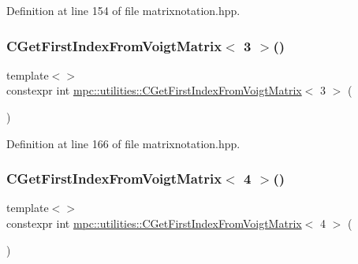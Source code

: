 Definition at line 154 of file matrixnotation.\+hpp.

\mbox{\label{namespacempc_1_1utilities_a80545c6ddda43d5f72754d0f18ec42fc}} 
\subsubsection{\texorpdfstring{C\+Get\+First\+Index\+From\+Voigt\+Matrix$<$ 3 $>$()}{CGetFirstIndexFromVoigtMatrix< 3 >()}}
{\footnotesize\ttfamily template$<$$>$ \\
constexpr int \mbox{\hyperlink{namespacempc_1_1utilities_acb1091d4fd58c0821eeeba68a43146ac}{mpc\+::utilities\+::\+C\+Get\+First\+Index\+From\+Voigt\+Matrix}}$<$ 3 $>$ (\begin{DoxyParamCaption}{ }\end{DoxyParamCaption})\hspace{0.3cm}{\ttfamily [inline]}}



Definition at line 166 of file matrixnotation.\+hpp.

\mbox{\label{namespacempc_1_1utilities_a9cc9cf00e8b46c7b4089290a9801dab8}} 
\subsubsection{\texorpdfstring{C\+Get\+First\+Index\+From\+Voigt\+Matrix$<$ 4 $>$()}{CGetFirstIndexFromVoigtMatrix< 4 >()}}
{\footnotesize\ttfamily template$<$$>$ \\
constexpr int \mbox{\hyperlink{namespacempc_1_1utilities_acb1091d4fd58c0821eeeba68a43146ac}{mpc\+::utilities\+::\+C\+Get\+First\+Index\+From\+Voigt\+Matrix}}$<$ 4 $>$ (\begin{DoxyParamCaption}{ }\end{DoxyParamCaption})\hspace{0.3cm}{\ttfamily [inline]}}



